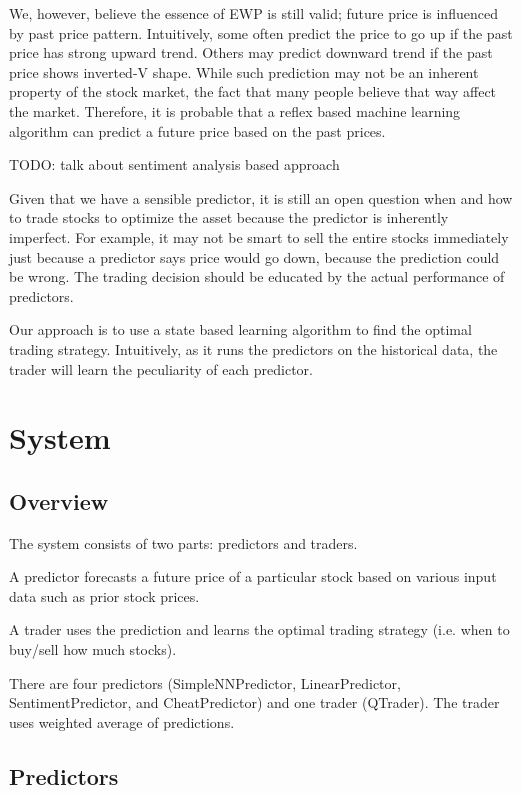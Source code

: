 \documentclass[twocolumn,10pt]{asme2ej}
\begin{document}
We, however, believe the essence of EWP is still valid; future price
is influenced by past price pattern. Intuitively, some often predict
the price to go up if the past price has strong upward trend. Others
may predict downward trend if the past price shows inverted-V
shape. While such prediction may not be an inherent property of the
stock market, the fact that many people believe that way affect the
market. Therefore, it is probable that a reflex based machine learning
algorithm can predict a future price based on the past prices.

TODO: talk about sentiment analysis based approach

Given that we have a sensible predictor, it is still an open question
when and how to trade stocks to optimize the asset because the
predictor is inherently imperfect. For example, it may not be smart to
sell the entire stocks immediately just because a predictor says price
would go down, because the prediction could be wrong. The trading
decision should be educated by the actual performance of predictors.

Our approach is to use a state based learning algorithm to find the
optimal trading strategy. Intuitively, as it runs the predictors on
the historical data, the trader will learn the peculiarity of each
predictor. 

\section{System}

\subsection{Overview}

The system consists of two parts: predictors and traders.

A predictor forecasts a future price of a particular stock based on
various input data such as prior stock prices.

A trader uses the prediction and learns the optimal trading strategy
(i.e. when to buy/sell how much stocks).

There are four predictors (SimpleNNPredictor, LinearPredictor,
SentimentPredictor, and CheatPredictor) and one trader
(QTrader). The trader uses weighted average of predictions.

\subsection{Predictors}
\end{document}
